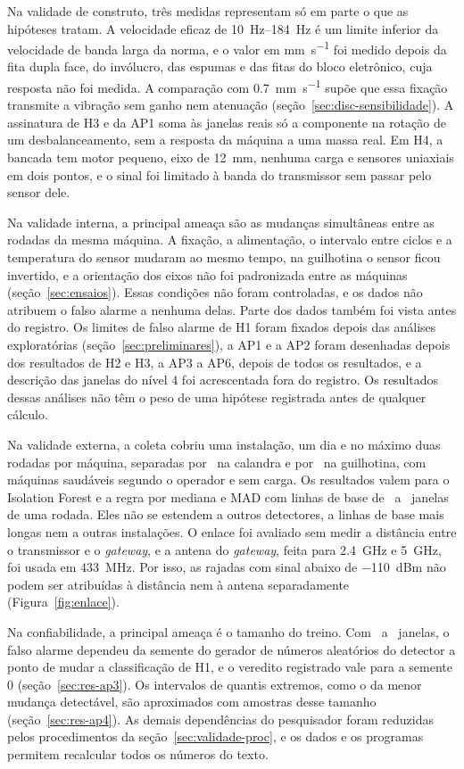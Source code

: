 Na validade de construto, três medidas representam só em parte o que as hipóteses tratam. A velocidade eficaz de \SIrange{10}{184}{\hertz} é um limite inferior da velocidade de banda larga da norma, e o valor em \si{\milli\meter\per\second} foi medido depois da fita dupla face, do invólucro, das espumas e das fitas do bloco eletrônico, cuja resposta não foi medida. A comparação com \SI{0,7}{\milli\meter\per\second} supõe que essa fixação transmite a vibração sem ganho nem atenuação (seção~\ref{sec:disc-sensibilidade}). A assinatura de H3 e da AP1 soma às janelas reais só a componente na rotação de um desbalanceamento, sem a resposta da máquina a uma massa real. Em H4, a bancada tem motor pequeno, eixo de \SI{12}{\milli\meter}, nenhuma carga e sensores uniaxiais em dois pontos, e o sinal foi limitado à banda do transmissor sem passar pelo sensor dele.

Na validade interna, a principal ameaça são as mudanças simultâneas entre as rodadas da mesma máquina. A fixação, a alimentação, o intervalo entre ciclos e a temperatura do sensor mudaram ao mesmo tempo, na guilhotina o sensor ficou invertido, e a orientação dos eixos não foi padronizada entre as máquinas (seção~\ref{sec:ensaios}). Essas condições não foram controladas, e os dados não atribuem o falso alarme a nenhuma delas. Parte dos dados também foi vista antes do registro. Os limites de falso alarme de H1 foram fixados depois das análises exploratórias (seção~\ref{sec:preliminares}), a AP1 e a AP2 foram desenhadas depois dos resultados de H2 e H3, a AP3 a AP6, depois de todos os resultados, e a descrição das janelas do nível 4 foi acrescentada fora do registro. Os resultados dessas análises não têm o peso de uma hipótese registrada antes de qualquer cálculo.

Na validade externa, a coleta cobriu uma instalação, um dia e no máximo duas rodadas por máquina, separadas por \campoIntervaloCalandra\ na calandra e por \campoIntervaloGuilhotina\ na guilhotina, com máquinas saudáveis segundo o operador e sem carga. Os resultados valem para o Isolation Forest e a regra por mediana e MAD com linhas de base de \campoJanelasGuilhotinaUm\ a \campoJanelasCalandraUm\ janelas de uma rodada. Eles não se estendem a outros detectores, a linhas de base mais longas nem a outras instalações. O enlace foi avaliado sem medir a distância entre o transmissor e o \textit{gateway}, e a antena do \textit{gateway}, feita para \SI{2,4}{\giga\hertz} e \SI{5}{\giga\hertz}, foi usada em \SI{433}{\mega\hertz}. Por isso, as rajadas com sinal abaixo de \SI{-110}{dBm} não podem ser atribuídas à distância nem à antena separadamente (Figura~\ref{fig:enlace}).

Na confiabilidade, a principal ameaça é o tamanho do treino. Com \campoJanelasGuilhotinaUm\ a \campoJanelasCalandraUm\ janelas, o falso alarme dependeu da semente do gerador de números aleatórios do detector a ponto de mudar a classificação de H1, e o veredito registrado vale para a semente 0 (seção~\ref{sec:res-ap3}). Os intervalos de quantis extremos, como o da menor mudança detectável, são aproximados com amostras desse tamanho (seção~\ref{sec:res-ap4}). As demais dependências do pesquisador foram reduzidas pelos procedimentos da seção~\ref{sec:validade-proc}, e os dados e os programas permitem recalcular todos os números do texto.
